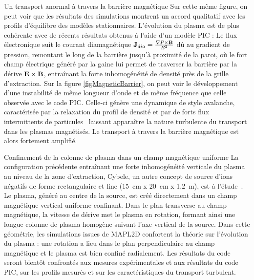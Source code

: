 \documentclass[a4paper,11pt]{article} %
\begin{document}
\begin{section}{Un transport anormal à travers la barrière magnétique}
Sur cette même figure, on peut voir que les résultats des simulations montrent un accord qualitatif avec les profils d'équilibre
des modèles stationnaires. L'évolution du plasma est de plus cohérente avec de récents résultats obtenus à l'aide d'un modèle 
PIC\cite{Boeuf} : Le flux électronique suit le courant diamagnétique $\mathbf{J}_{dia}=\frac{\nabla P\times\mathbf{B}}{B^2}$
dû au gradient de pression, remontant le long de la barrière jusqu'à proximité de la paroi, où le fort champ électrique 
généré par la gaine lui permet de traverser la barrière par la dérive $\mathbf{E}\times\mathbf{B}$, entraînant la forte
inhomogénéité de densité près de la grille d'extraction. Sur la figure \ref{figMagneticBarrier}, on peut voir le développement
d'une instabilité de même longueur d'onde et de même fréquence que celle observée avec le code PIC. Celle-ci 
génère une dynamique de style avalanche, caractérisée par la relaxation du profil de densité et par de forts flux intermittents de 
particules~\cite{Sarazin} laissant apparaître la nature turbulente du transport dans les plasmas magnétisés. 
Le transport à travers la barrière magnétique est alors fortement amplifié.

\end{section}

\begin{section}{Confinement de la colonne de plasma dans un champ magnétique uniforme}
La configuration précédente entraînant une forte inhomogénéité verticale du plasma au niveau de la zone d'extraction, 
Cybele, un autre concept de source d'ions négatifs de forme rectangulaire et fine (15~cm x 20~cm x 1.2~m), est à 
l'étude~\cite{Simonin}. Le plasma, généré au centre de la source, est créé directement dans un champ magnétique vertical uniforme confinant. 
Dans le plan transverse au champ magnétique, la vitesse de dérive met le plasma en rotation, formant ainsi une longue 
colonne de plasma homogène suivant l'axe vertical de la source. Dans cette géométrie, les simulations issues de MAPL2D 
confortent la théorie sur l'évolution du plasma : une rotation a lieu dans le plan perpendiculaire au champ magnétique 
et le plasma est bien confiné radialement. Les résultats du code seront bientôt confrontés aux mesures expérimentales et aux
résultats du code PIC, sur les profils mesurés et sur les caractéristiques du transport turbulent.
\end{section}
\end{document}
